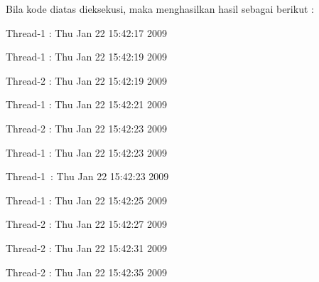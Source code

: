 \documentclass [12pt,a4paper,notitlepage,oneside,bahasa]{article}
\begin{document}
	
	
	\newpage
	
	Bila kode diatas dieksekusi, maka menghasilkan hasil sebagai berikut : \par
\vspace{10pt}
\noindent 
\begin{center}{\fontsize{10pt}{10pt}\selectfont Thread-1 : Thu Jan 22 15:42:17 2009}\end{center} \par
\noindent 
\begin{center}{\fontsize{10pt}{10pt}\selectfont Thread-1 : Thu Jan 22 15:42:19 2009}\end{center} \par
\noindent 
\begin{center}{\fontsize{10pt}{10pt}\selectfont Thread-2 : Thu Jan 22 15:42:19 2009}\end{center} \par
\noindent 
\begin{center}{\fontsize{10pt}{10pt}\selectfont Thread-1 : Thu Jan 22 15:42:21 2009}\end{center} \par
\noindent 
\begin{center}{\fontsize{10pt}{10pt}\selectfont Thread-2 : Thu Jan 22 15:42:23 2009}\end{center} \par
\noindent 
\begin{center}{\fontsize{10pt}{10pt}\selectfont Thread-1 : Thu Jan 22 15:42:23 2009}\end{center} \par
\noindent 
\begin{center}{\fontsize{10pt}{10pt}\selectfont Thread-1~:  Thu Jan 22 15:42:23 2009}\end{center} \par
\noindent 
\begin{center}{\fontsize{10pt}{10pt}\selectfont Thread-1 : Thu Jan 22 15:42:25 2009}\end{center} \par
\noindent 
\begin{center}{\fontsize{10pt}{10pt}\selectfont Thread-2 : Thu Jan 22 15:42:27 2009}\end{center} \par
\noindent 
\begin{center}{\fontsize{10pt}{10pt}\selectfont Thread-2 : Thu Jan 22 15:42:31 2009}\end{center} \par
\noindent 
\begin{center}{\fontsize{10pt}{10pt}\selectfont Thread-2 : Thu Jan 22 15:42:35 2009}\end{center} \par
\end{document}
